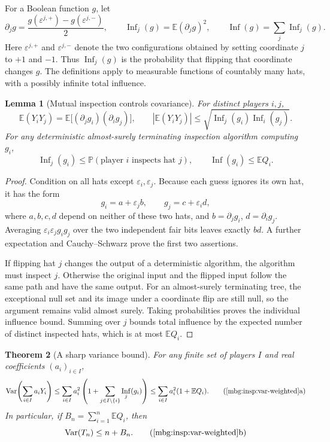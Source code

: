 \documentclass[11pt,letterpaper]{article}
\newtheorem{theorem}{Theorem}[section]
\newtheorem{lemma}[theorem]{Lemma}
\theoremstyle{definition}
\newcommand{\E}{\mathbb E}
\newcommand{\Prb}{\mathbb P}
\DeclareMathOperator{\Var}{Var}
\DeclareMathOperator{\Inf}{Inf}
\begin{document}
For a Boolean function $g$, let
\[
 \partial_jg
 =\frac{g(\varepsilon^{j,+})-g(\varepsilon^{j,-})}{2},
 \qquad
 \Inf_j(g)=\E(\partial_jg)^2,
 \qquad
 \Inf(g)=\sum_j\Inf_j(g).
\]
Here $\varepsilon^{j,+}$ and $\varepsilon^{j,-}$ denote the two
configurations obtained by setting coordinate $j$ to $+1$ and $-1$.
Thus $\Inf_j(g)$ is the probability that flipping that coordinate
changes $g$.  The definitions apply to measurable functions of
countably many hats, with a possibly infinite total influence.

\begin{lemma}[Mutual inspection controls covariance]
\label{mbg:insp:var-covariance}
For distinct players $i,j$,
\[
 \E(Y_iY_j)=\E\bigl[(\partial_jg_i)(\partial_ig_j)\bigr],
 \qquad
 |\E(Y_iY_j)|
 \le\sqrt{\Inf_j(g_i)\Inf_i(g_j)}.
\]
For any deterministic almost-surely terminating inspection algorithm
computing $g_i$,
\[
 \Inf_j(g_i)\le\Prb(\text{player $i$ inspects hat $j$}),
 \qquad \Inf(g_i)\le\E Q_i.
\]
\end{lemma}

\begin{proof}
Condition on all hats except $\varepsilon_i,\varepsilon_j$.
Because each guess ignores its own hat, it has the form
\[
 g_i=a+\varepsilon_jb,
 \qquad g_j=c+\varepsilon_id,
\]
where $a,b,c,d$ depend on neither of these two hats, and
$b=\partial_jg_i$, $d=\partial_ig_j$.
Averaging $\varepsilon_i\varepsilon_jg_ig_j$ over the two independent
fair bits leaves exactly $bd$.  A further expectation and
Cauchy--Schwarz prove the first two assertions.

If flipping hat $j$ changes the output of a deterministic algorithm,
the algorithm must inspect $j$.  Otherwise the original input and the
flipped input follow the same path and have the same output.  For an
almost-surely terminating tree, the exceptional null set and its image
under a coordinate flip are still null, so the argument remains valid
almost surely.  Taking probabilities proves the individual influence
bound.  Summing over $j$ bounds total influence by the expected number
of distinct inspected hats, which is at most $\E Q_i$.
\end{proof}

\begin{theorem}[A sharp variance bound]
\label{mbg:insp:var-weighted}
For any finite set of players $I$ and real coefficients $(a_i)_{i\in I}$,
\[
 \Var\!\left(\sum_{i\in I}a_iY_i\right)
 \le\sum_{i\in I}a_i^2
       \left(1+\sum_{j\in I\setminus\{i\}}\Inf_j(g_i)\right)
 \le\sum_{i\in I}a_i^2(1+\E Q_i).
 \tag{\ref{mbg:insp:var-weighted}a}
\]
In particular, if $B_n=\sum_{i=1}^n\E Q_i$, then
\[
 \Var(T_n)\le n+B_n.
 \tag{\ref{mbg:insp:var-weighted}b}
\]
\end{theorem}
\end{document}
